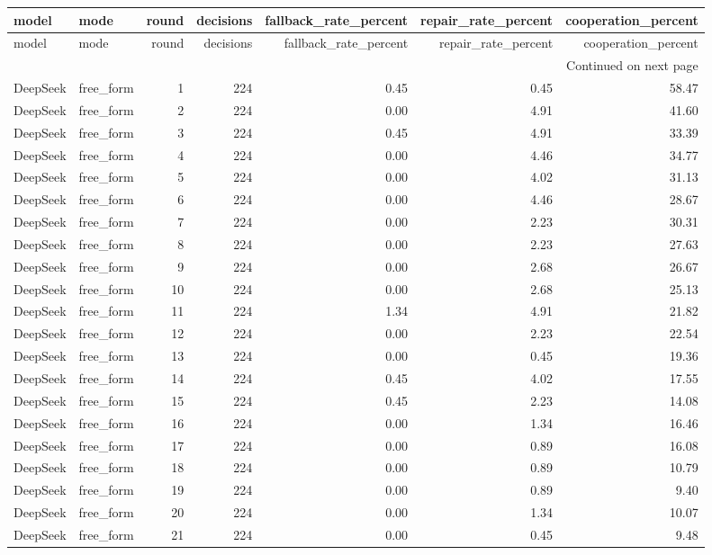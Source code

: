 \begin{longtable}{llrrrrr}
\toprule
model & mode & round & decisions & fallback\_rate\_percent & repair\_rate\_percent & cooperation\_percent \\
\midrule
\endfirsthead
\toprule
model & mode & round & decisions & fallback\_rate\_percent & repair\_rate\_percent & cooperation\_percent \\
\midrule
\endhead
\midrule
\multicolumn{7}{r}{Continued on next page} \\
\midrule
\endfoot
\bottomrule
\endlastfoot
DeepSeek & free\_form & 1 & 224 & 0.45 & 0.45 & 58.47 \\
DeepSeek & free\_form & 2 & 224 & 0.00 & 4.91 & 41.60 \\
DeepSeek & free\_form & 3 & 224 & 0.45 & 4.91 & 33.39 \\
DeepSeek & free\_form & 4 & 224 & 0.00 & 4.46 & 34.77 \\
DeepSeek & free\_form & 5 & 224 & 0.00 & 4.02 & 31.13 \\
DeepSeek & free\_form & 6 & 224 & 0.00 & 4.46 & 28.67 \\
DeepSeek & free\_form & 7 & 224 & 0.00 & 2.23 & 30.31 \\
DeepSeek & free\_form & 8 & 224 & 0.00 & 2.23 & 27.63 \\
DeepSeek & free\_form & 9 & 224 & 0.00 & 2.68 & 26.67 \\
DeepSeek & free\_form & 10 & 224 & 0.00 & 2.68 & 25.13 \\
DeepSeek & free\_form & 11 & 224 & 1.34 & 4.91 & 21.82 \\
DeepSeek & free\_form & 12 & 224 & 0.00 & 2.23 & 22.54 \\
DeepSeek & free\_form & 13 & 224 & 0.00 & 0.45 & 19.36 \\
DeepSeek & free\_form & 14 & 224 & 0.45 & 4.02 & 17.55 \\
DeepSeek & free\_form & 15 & 224 & 0.45 & 2.23 & 14.08 \\
DeepSeek & free\_form & 16 & 224 & 0.00 & 1.34 & 16.46 \\
DeepSeek & free\_form & 17 & 224 & 0.00 & 0.89 & 16.08 \\
DeepSeek & free\_form & 18 & 224 & 0.00 & 0.89 & 10.79 \\
DeepSeek & free\_form & 19 & 224 & 0.00 & 0.89 & 9.40 \\
DeepSeek & free\_form & 20 & 224 & 0.00 & 1.34 & 10.07 \\
DeepSeek & free\_form & 21 & 224 & 0.00 & 0.45 & 9.48 \\

\end{longtable}
